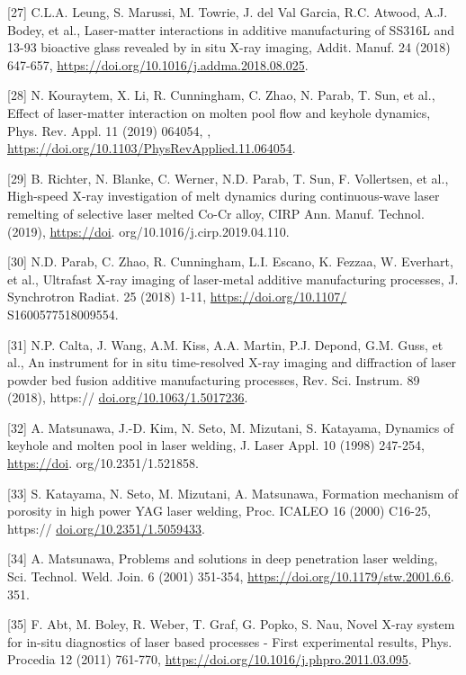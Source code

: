 \documentclass[10pt]{article}
\begin{document}
[27] C.L.A. Leung, S. Marussi, M. Towrie, J. del Val Garcia, R.C. Atwood, A.J. Bodey, et al., Laser-matter interactions in additive manufacturing of SS316L and 13-93 bioactive glass revealed by in situ X-ray imaging, Addit. Manuf. 24 (2018) 647-657, \href{https://doi.org/10.1016/j.addma.2018.08.025}{https://doi.org/10.1016/j.addma.2018.08.025}.

[28] N. Kouraytem, X. Li, R. Cunningham, C. Zhao, N. Parab, T. Sun, et al., Effect of laser-matter interaction on molten pool flow and keyhole dynamics, Phys. Rev. Appl. 11 (2019) 064054, , \href{https://doi.org/10.1103/PhysRevApplied.11.064054}{https://doi.org/10.1103/PhysRevApplied.11.064054}.

[29] B. Richter, N. Blanke, C. Werner, N.D. Parab, T. Sun, F. Vollertsen, et al., High-speed $\mathrm{X}$-ray investigation of melt dynamics during continuous-wave laser remelting of selective laser melted Co-Cr alloy, CIRP Ann. Manuf. Technol. (2019), \href{https://doi}{https://doi}. org/10.1016/j.cirp.2019.04.110.

[30] N.D. Parab, C. Zhao, R. Cunningham, L.I. Escano, K. Fezzaa, W. Everhart, et al., Ultrafast X-ray imaging of laser-metal additive manufacturing processes, J. Synchrotron Radiat. 25 (2018) 1-11, \href{https://doi.org/10.1107/}{https://doi.org/10.1107/} S1600577518009554.

[31] N.P. Calta, J. Wang, A.M. Kiss, A.A. Martin, P.J. Depond, G.M. Guss, et al., An instrument for in situ time-resolved X-ray imaging and diffraction of laser powder bed fusion additive manufacturing processes, Rev. Sci. Instrum. 89 (2018), https:// \href{http://doi.org/10.1063/1.5017236}{doi.org/10.1063/1.5017236}.

[32] A. Matsunawa, J.-D. Kim, N. Seto, M. Mizutani, S. Katayama, Dynamics of keyhole and molten pool in laser welding, J. Laser Appl. 10 (1998) 247-254, \href{https://doi}{https://doi}. org/10.2351/1.521858.

[33] S. Katayama, N. Seto, M. Mizutani, A. Matsunawa, Formation mechanism of porosity in high power YAG laser welding, Proc. ICALEO 16 (2000) C16-25, https:// \href{http://doi.org/10.2351/1.5059433}{doi.org/10.2351/1.5059433}.

[34] A. Matsunawa, Problems and solutions in deep penetration laser welding, Sci. Technol. Weld. Join. 6 (2001) 351-354, \href{https://doi.org/10.1179/stw.2001.6.6}{https://doi.org/10.1179/stw.2001.6.6}. 351.

[35] F. Abt, M. Boley, R. Weber, T. Graf, G. Popko, S. Nau, Novel X-ray system for in-situ diagnostics of laser based processes - First experimental results, Phys. Procedia 12 (2011) 761-770, \href{https://doi.org/10.1016/j.phpro.2011.03.095}{https://doi.org/10.1016/j.phpro.2011.03.095}.
\end{document}
